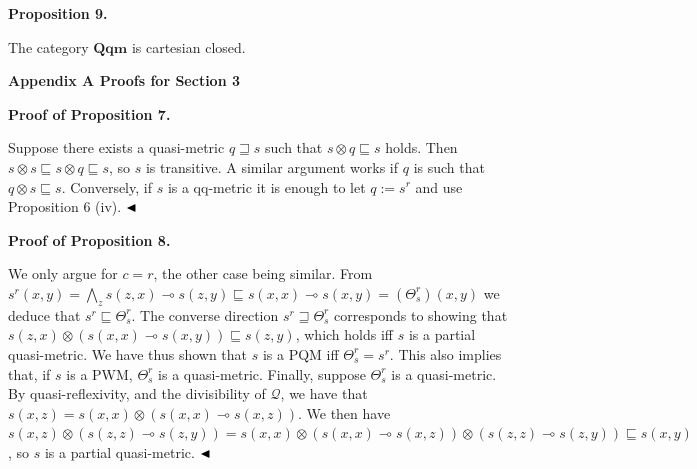 \documentclass[10pt,a4paper]{amsart}
\begin{document}
 
 
 

 
\par\medskip\noindent\textbf{Proposition 9.}\par
 
 
The category $\mathbf{Qqm}$ is cartesian closed.\par
 
 

 
\par\medskip\noindent\textbf{Appendix A Proofs for Section 3}\par
 
 
\par\medskip\noindent\textbf{Proof of Proposition 7.}\par
 
 
Suppose there exists a quasi-metric $q\sqsupseteq s$ such that $s\otimes q\sqsubseteq s$ holds. Then $s\otimes s\sqsubseteq s\otimes q\sqsubseteq s$, so $s$ is transitive. A similar argument works if $q$ is such that $q\otimes s\sqsubseteq s$. Conversely, if $s$ is a qq-metric it is enough to let $q:=s^{r}$ and use Proposition 6 (iv). $\hfill\blacktriangleleft$\par
 
 
 
 
\par\medskip\noindent\textbf{Proof of Proposition 8.}\par
 
 
We only argue for $c=r$, the other case being similar. From $s^{r}(x,y)=\bigwedge_{z}s(z,x)\multimap s(z,y)\sqsubseteq s(x,x)\multimap s(x,%
y)=(\Theta^{r}_{s})(x,y)$ we deduce that $s^{r}\sqsubseteq\Theta^{r}_{s}$. The converse direction $s^{r}\sqsupseteq\Theta^{r}_{s}$ corresponds to showing that $s(z,x)\otimes(s(x,x)\multimap s(x,y))\sqsubseteq s(z,y)$, which holds iff $s$ is a partial quasi-metric. We have thus shown that $s$ is a PQM iff $\Theta^{r}_{s}=s^{r}$. This also implies that, if $s$ is a PWM, $\Theta^{r}_{s}$ is a quasi-metric. Finally, suppose $\Theta^{r}_{s}$ is a quasi-metric. By quasi-reflexivity, and the divisibility of $\mathcal{Q}$, we have that $s(x,z)=s(x,x)\otimes(s(x,x)\multimap s(x,z))$. We then have $s(x,z)\otimes(s(z,z)\multimap s(z,y))=s(x,x)\otimes(s(x,x)\multimap s(x,z))%
\otimes(s(z,z)\multimap s(z,y))\sqsubseteq s(x,y)$, so $s$ is a partial quasi-metric. $\hfill\blacktriangleleft$\par
 
\end{document}
